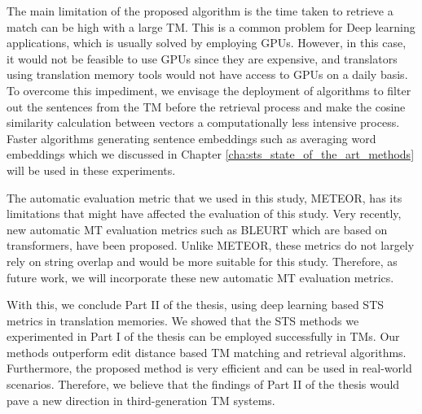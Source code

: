 The main limitation of the proposed algorithm is the time taken to retrieve a match can be high with a large TM. This is a common problem for Deep learning applications, which is usually solved by employing GPUs. However, in this case, it would not be feasible to use GPUs since they are expensive, and translators using translation memory tools would not have access to GPUs on a daily basis. To overcome this impediment, we envisage the deployment of algorithms to filter out the sentences from the TM before the retrieval process and make the cosine similarity calculation between vectors a computationally less intensive process. Faster algorithms generating sentence embeddings such as averaging word embeddings which we discussed in Chapter \ref{cha:sts_state_of_the_art_methods} will be used in these experiments. 

The automatic evaluation metric that we used in this study, METEOR, has its limitations that might have affected the evaluation of this study. Very recently, new automatic MT evaluation metrics such as BLEURT \autocite{sellam-etal-2020-bleurt} which are based on transformers, have been proposed. Unlike METEOR, these metrics do not largely rely on string overlap and would be more suitable for this study. Therefore, as future work, we will incorporate these new automatic MT evaluation metrics.

With this, we conclude Part II of the thesis, using deep learning based STS metrics in translation memories. We showed that the STS methods we experimented in Part I of the thesis can be employed successfully in TMs. Our methods outperform edit distance based TM matching and retrieval algorithms. Furthermore, the proposed method is very efficient and can be used in real-world scenarios. Therefore, we believe that the findings of Part II of the thesis would pave a new direction in third-generation TM systems.

 

